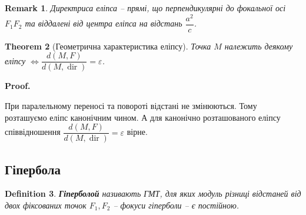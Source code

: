 \documentclass[a4paper, 10pt]{extarticle}
\makeatletter
\def\qed{$\blacksquare$}
\def\qed{$\blacksquare$}
\theoremstyle{theoremdd}
\newtheorem{theorem}{Theorem}[subsection]
\theoremstyle{theoremdd}
\newtheorem{definition}[theorem]{Definition}
\theoremstyle{theoremdd}
\theoremstyle{theoremdd}
\theoremstyle{theoremdd}
\theoremstyle{theoremdd}
\newtheorem{remark}[theorem]{Remark}
\theoremstyle{theoremdd}
\theoremstyle{theoremdd}
\renewenvironment{proof}[1][Proof.\\]{\par
\pushQED{\hfill \qed}%
\normalfont \topsep6\p@\@plus6\p@\relax
\trivlist
\item\relax
{\bfseries
#1\@addpunct{.}}\hspace\labelsep\ignorespaces
}{%
\popQED\endtrivlist\@endpefalse
}
\DeclareMathOperator{\dir}{dir}
\makeatother
\begin{document}
\begin{remark}
Директриса еліпса -- прямі, що перпендикулярні до фокальної осі $F_1F_2$ та віддалені від центра еліпса на відстань $\dfrac{a^2}{c}$.
\end{remark}

\begin{theorem}[Геометрична характеристика еліпсу]
Точка $M$ належить деякому еліпсу $\iff \dfrac{d(M,F)}{d(M,\dir)} = \varepsilon$.
\end{theorem}

\begin{proof}
При паралельному переносі та повороті відстані не змінюються. Тому розташуємо еліпс канонічним чином. А для канонічно розташованого еліпсу співвідношення $\dfrac{d(M,F)}{d(M,\dir)} = \varepsilon$ вірне.
\end{proof}

\subsection{Гіпербола}
\begin{definition}
\textbf{Гіперболой} називають ГМТ, для яких модуль різниці відстаней від двох фіксованих точок $F_1,F_2$ -- фокуси гіперболи -- є постійною.
\end{definition}
\end{document}
